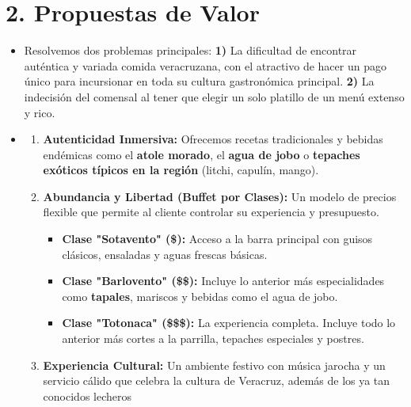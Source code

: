 \documentclass[12pt, letterpaper, twocolumn]{article}
\newcommand{\textit}[1]{\item[\textbf{--- #1}]} %
\begin{document}
\section*{2. Propuestas de Valor}
\begin{itemize}
    \textit{¿Qué problema ayudas a solucionar?}
    Resolvemos dos problemas principales: \textbf{1)} La dificultad de encontrar auténtica y variada comida veracruzana, con el atractivo de hacer un pago único para incursionar en toda su cultura gastronómica principal. \textbf{2)} La indecisión del comensal al tener que elegir un solo platillo de un menú extenso y rico.

    \textit{¿Qué valor ofreces a tus clientes?}
    \begin{enumerate}
        \item \textbf{Autenticidad Inmersiva:} Ofrecemos recetas tradicionales y bebidas endémicas como el \textbf{atole morado}, el \textbf{agua de jobo} o \textbf{tepaches exóticos típicos en la región} (litchi, capulín, mango).
        \item \textbf{Abundancia y Libertad (Buffet por Clases):} Un modelo de precios flexible que permite al cliente controlar su experiencia y presupuesto.
            \begin{itemize}
                \item \textbf{Clase "Sotavento" (\$):} Acceso a la barra principal con guisos clásicos, ensaladas y aguas frescas básicas.
                \item \textbf{Clase "Barlovento" (\$\$):} Incluye lo anterior más especialidades como \textbf{tapales}, mariscos y bebidas como el agua de jobo.
                \item \textbf{Clase "Totonaca" (\$\$\$):} La experiencia completa. Incluye todo lo anterior más cortes a la parrilla, tepaches especiales y postres.
            \end{itemize}
        \item \textbf{Experiencia Cultural:} Un ambiente festivo con música jarocha y un servicio cálido que celebra la cultura de Veracruz, además de los ya tan conocidos lecheros
    \end{enumerate}
\end{itemize}

\end{document}
